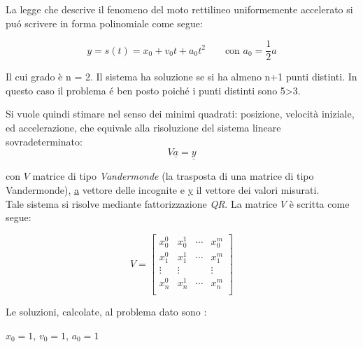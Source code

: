 \begin{center}
\large\noindent{}\end{center}

\noindent La legge che descrive il fenomeno del moto rettilineo uniformemente accelerato si pu\'o scrivere in forma polinomiale come segue:

\[
y =  s(t) = x_0 + v_0t + a_0t^2 \quad \quad \text{con } a_0 = \frac{1}{2}a
\]

\noindent Il cui grado è n = 2. Il sistema ha soluzione se si ha almeno n+1 punti distinti.
In questo caso il problema \'e ben posto poich\'e i punti distinti sono 5>3.

\noindent Si vuole quindi stimare nel senso dei minimi quadrati: posizione, velocità iniziale, ed accelerazione, che equivale alla risoluzione del sistema lineare sovradeterminato:
\[
V\underline{a}=\underline{y}
\]

\noindent con $V$ matrice di tipo \textit{Vandermonde} (la trasposta di una matrice di tipo Vandermonde), \underline{a} vettore delle incognite e  \underline{y} il vettore dei valori misurati. \\
\noindent Tale sistema si risolve mediante fattorizzazione \textit{QR}. La matrice $V$ è scritta come segue: 

\[
V=\begin{bmatrix}
x_0^0 & x_0^1 & \cdots & x_0^m \\
x_1^0 & x_1^1 & \cdots & x_1^m \\
\vdots & \vdots & & \vdots \\
x_n^0 & x_n^1 & \cdots & x_n^m \\		
\end{bmatrix}
\]
\vspace*{0.5cm}



\noindent Le soluzioni, calcolate, al problema dato sono :
\begin{center}
	$x_0 = 1$, $v_0 = 1$, $a_0 = 1$ 
\end{center}